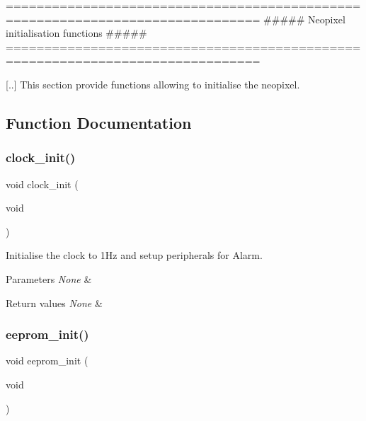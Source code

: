 \begin{DoxyVerb} ===============================================================================
         ##### Neopixel initialisation functions #####
 ===============================================================================

 [..] This section provide functions allowing to initialise the neopixel.\end{DoxyVerb}
 

\subsection{Function Documentation}
\mbox{\label{group___initialisation_ga78ab77b57cf2e00089f0a3a22508524c}} 
\subsubsection{\texorpdfstring{clock\+\_\+init()}{clock\_init()}}
{\footnotesize\ttfamily void clock\+\_\+init (\begin{DoxyParamCaption}\item[{void}]{ }\end{DoxyParamCaption})}



Initialise the clock to 1\+Hz and setup peripherals for Alarm. 


\begin{DoxyParams}{Parameters}
{\em None} & \\
\hline
\end{DoxyParams}

\begin{DoxyRetVals}{Return values}
{\em None} & \\
\hline
\end{DoxyRetVals}
\mbox{\label{group___initialisation_ga4ec7f9d780da432051aa74ec5892a94c}} 
\subsubsection{\texorpdfstring{eeprom\+\_\+init()}{eeprom\_init()}}
{\footnotesize\ttfamily void eeprom\+\_\+init (\begin{DoxyParamCaption}\item[{void}]{ }\end{DoxyParamCaption})}



